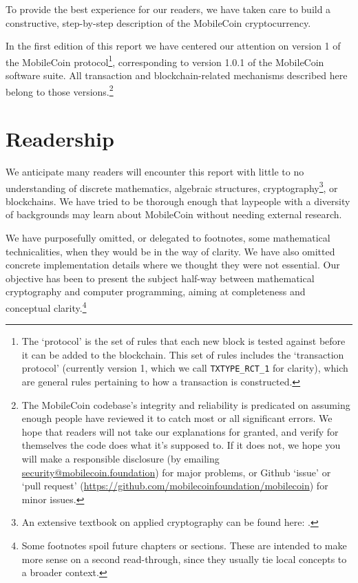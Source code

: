 To provide the best experience for our readers, we have taken care to build a constructive, step-by-step description of the MobileCoin cryptocurrency.

In the first edition of this report we have centered our attention on version 1 of the MobileCoin protocol\footnote{The `protocol' is the set of rules that each new block is tested against before it can be added to the blockchain. This set of rules includes the `transaction protocol' (currently version 1, which we call {\tt TXTYPE\_RCT\_1} for clarity), which are general rules pertaining to how a transaction is constructed.}, corresponding to version 1.0.1 of the MobileCoin software suite. All transaction and blockchain-related mechanisms described here belong to those versions.\footnote{The MobileCoin codebase's integrity and reliability is predicated on assuming enough people have reviewed it to catch most or all significant errors. We hope that readers will not take our explanations for granted, and verify for themselves the code does what it's supposed to. If it does not, we hope you will make a responsible disclosure (by emailing \url{security@mobilecoin.foundation}) for major problems, or Github `issue' or `pull request' (\url{https://github.com/mobilecoinfoundation/mobilecoin}) for minor issues.}%



\section{Readership}

We anticipate many readers will encounter this report with little to no understanding of discrete mathematics, algebraic structures, cryptography\footnote{An extensive textbook on applied cryptography can be found here: \cite{applied-cryptography-textbook}.}, or blockchains. We have tried to be thorough enough that laypeople with a diversity of backgrounds may learn about MobileCoin without needing external research.

We have purposefully omitted, or delegated to footnotes, some mathematical technicalities, when they would be in the way of clarity. We have also omitted concrete implementation details where we thought they were not essential. Our objective has been to present the subject half-way between mathematical cryptography and computer programming, aiming at completeness and conceptual clarity.\footnote{Some footnotes spoil future chapters or sections. These are intended to make more sense on a second read-through, since they usually tie local concepts to a broader context.}



